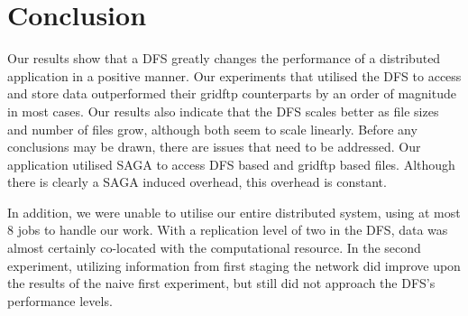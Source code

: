 \documentclass[a4paper,11pt]{article} \pagestyle{empty} \usepackage{amssymb}
\newcommand{\micnote}[1]{ {\textcolor{blue} { ***Michael: #1 }}} \else
\newcommand{\jhanote}[1]{} \newcommand{\micnote}[1]{} \newcommand{\fixme}[1]{}
\begin{document}
\section{Conclusion}
Our results show that a DFS greatly changes the performance of a
distributed application in a positive manner. Our experiments that
utilised the DFS to access and store data outperformed their gridftp
counterparts by an order of magnitude in most cases. Our results also
indicate that the DFS scales better as file sizes and number of files
grow, although both seem to scale linearly. Before any conclusions may
be drawn, there are issues that need to be addressed. Our application
utilised SAGA to access DFS based and gridftp based files. Although
there is clearly a SAGA induced overhead, this overhead is constant.
\jhanote{ We need to discuss performance issue: Ole has performance
numbers that contradict this, i.e., the overhead that SAGA introduces
for file/gridftp is very small compared to native globus calls. This may
be due to SAGA's adaptive nature, where lots of computation is spent
determining how to make a distributed call. Other reason's may be the
gridftp SAGA adaptor being separated from the application, being able
to make only general decisions, allowing no performance tweaks. }
\jhanote{Accessing files through this abstraction with gridftp seemed to
perform sub-optimally in comparison to using the globus tools directly.}
In addition, we were unable to utilise our entire
distributed system, using at most 8 jobs to handle our work. With a
replication level of two in the DFS, data was almost certainly
co-located with the computational resource. In the second experiment,
utilizing information from first staging the network did improve upon
the results of the naive first experiment, but still did not approach
the DFS's performance levels.
\end{document}

